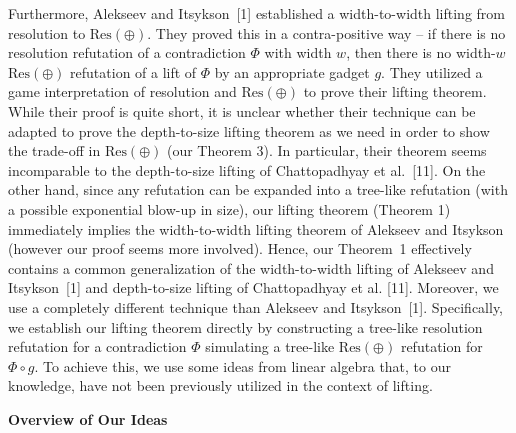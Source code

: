 \documentclass[10pt,a4paper]{article}
\begin{document}
Furthermore, Alekseev and Itsykson [1] established a width-to-width lifting from resolution to $\text{Res}(\oplus)$.
They proved this in a contra-positive way – if there is no resolution refutation of a contradiction $\Phi$ with width $w$, then there is no width-$w$ $\text{Res}(\oplus)$ refutation of a lift of $\Phi$ by an appropriate gadget $g$.
They utilized a game interpretation of resolution and $\text{Res}(\oplus)$ to prove their lifting theorem.
While their proof is quite short, it is unclear whether their technique can be adapted to prove the depth-to-size lifting theorem as we need in order to show the trade-off in $\text{Res}(\oplus)$ (our Theorem 3). In particular, their theorem seems incomparable to the depth-to-size lifting of Chattopadhyay et al. [11].
On the other hand, since any refutation can be expanded into a tree-like refutation (with a possible exponential blow-up in size), our lifting theorem (Theorem 1) immediately implies the width-to-width lifting theorem of Alekseev and Itsykson (however our proof seems more involved). Hence, our Theorem 1 effectively contains a common generalization of the width-to-width lifting of Alekseev and Itsykson [1] and depth-to-size lifting of Chattopadhyay et al. [11].
Moreover, we use a completely different technique than Alekseev and Itsykson [1].
Specifically, we establish our lifting theorem directly by constructing a tree-like resolution refutation for a contradiction $\Phi$ simulating a tree-like $\text{Res}(\oplus)$ refutation for $\Phi\circ g$.
To achieve this, we use some ideas from linear algebra that, to our knowledge, have not been previously utilized in the context of lifting.\par





\par\medskip\noindent\textbf{Overview of Our Ideas}\par
\end{document}
